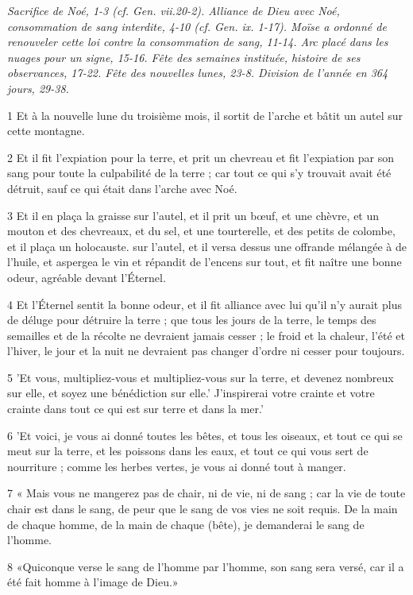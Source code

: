 \par \textit{Sacrifice de Noé, 1-3 (cf. Gen. vii.20-2). Alliance de Dieu avec Noé, consommation de sang interdite, 4-10 (cf. Gen. ix. 1-17). Moïse a ordonné de renouveler cette loi contre la consommation de sang, 11-14. Arc placé dans les nuages ​​pour un signe, 15-16. Fête des semaines instituée, histoire de ses observances, 17-22. Fête des nouvelles lunes, 23-8. Division de l'année en 364 jours, 29-38.}

\par 1 Et à la nouvelle lune du troisième mois, il sortit de l'arche et bâtit un autel sur cette montagne.
\par 2 Et il fit l'expiation pour la terre, et prit un chevreau et fit l'expiation par son sang pour toute la culpabilité de la terre ; car tout ce qui s'y trouvait avait été détruit, sauf ce qui était dans l'arche avec Noé.
\par 3 Et il en plaça la graisse sur l'autel, et il prit un bœuf, et une chèvre, et un mouton et des chevreaux, et du sel, et une tourterelle, et des petits de colombe, et il plaça un holocauste. sur l'autel, et il versa dessus une offrande mélangée à de l'huile, et aspergea le vin et répandit de l'encens sur tout, et fit naître une bonne odeur, agréable devant l'Éternel.
\par 4 Et l'Éternel sentit la bonne odeur, et il fit alliance avec lui qu'il n'y aurait plus de déluge pour détruire la terre ; que tous les jours de la terre, le temps des semailles et de la récolte ne devraient jamais cesser ; le froid et la chaleur, l'été et l'hiver, le jour et la nuit ne devraient pas changer d'ordre ni cesser pour toujours.
\par 5 'Et vous, multipliez-vous et multipliez-vous sur la terre, et devenez nombreux sur elle, et soyez une bénédiction sur elle.' J'inspirerai votre crainte et votre crainte dans tout ce qui est sur terre et dans la mer.'
\par 6 'Et voici, je vous ai donné toutes les bêtes, et tous les oiseaux, et tout ce qui se meut sur la terre, et les poissons dans les eaux, et tout ce qui vous sert de nourriture ; comme les herbes vertes, je vous ai donné tout à manger.
\par 7 « Mais vous ne mangerez pas de chair, ni de vie, ni de sang ; car la vie de toute chair est dans le sang, de peur que le sang de vos vies ne soit requis. De la main de chaque homme, de la main de chaque (bête), je demanderai le sang de l'homme.
\par 8 «Quiconque verse le sang de l'homme par l'homme, son sang sera versé, car il a été fait homme à l'image de Dieu.»
